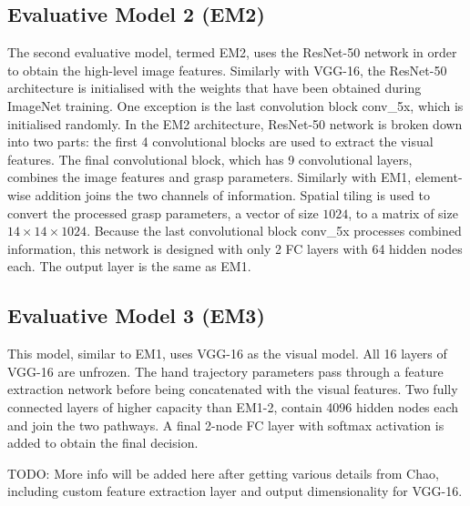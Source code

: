 \subsection{Evaluative Model 2 (EM2)}


The second evaluative model, termed EM2, uses the ResNet-50 network in order to obtain the high-level image features. Similarly with VGG-16, the ResNet-50 architecture is initialised with the weights that have been obtained during ImageNet training. One exception is the last convolution block conv\_5x, which is initialised randomly. In the EM2 architecture, ResNet-50 network is broken down into two parts: the first 4 convolutional blocks are used to extract the visual features. The final convolutional block, which has 9 convolutional layers, combines the image features and grasp parameters. Similarly with EM1, element-wise addition joins the two channels of information. Spatial tiling is used to convert the processed grasp parameters, a vector of size $1024$, to a matrix of size $14 \times 14 \times 1024$. Because the last convolutional block conv\_5x processes combined information, this network is designed with only 2 FC layers with 64 hidden nodes each. The output layer is the same as EM1. 

\subsection{Evaluative Model 3 (EM3)}

This model, similar to EM1, uses VGG-16 as the visual model. All 16 layers of VGG-16 are unfrozen. The hand trajectory parameters pass through a feature extraction network before being concatenated with the visual features. Two fully connected layers of higher capacity than EM1-2, contain 4096 hidden nodes each and join the two pathways. A final 2-node FC layer with softmax activation is added to obtain the final decision.

TODO: More info will be added here after getting various details from Chao, including custom feature extraction layer and output dimensionality for VGG-16.

